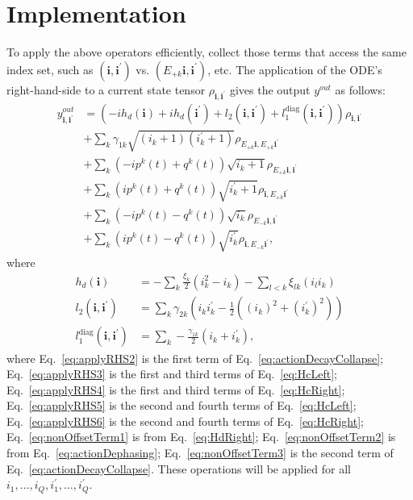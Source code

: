 \documentclass[letterpaper]{article}
\newcommand{\bfi}{\boldsymbol{i}}
\newcommand{\Epk}{E_{+k}}
\newcommand{\Emk}{E_{-k}}
\newcommand{\YC}[1]{{\textcolor{Bronze}{#1}}}
\begin{document}
\section{Implementation}

  To apply the above operators efficiently, collect those terms that access the
  same index set, such as $(\bfi,\bfi^\prime)$ vs. $(E_{+k}\bfi, \bfi^\prime)$,
  etc. The application of the ODE's right-hand-side to a current state tensor
  $\rho_{\bfi,\bfi^\prime}$ gives the output $y^{out}$ as follows:
  \begin{align} 
       y^{out}_{\bfi,\bfi^\prime}  &= 
       \left(-i h_d(\bfi) + ih_d(\bfi^\prime)
        + l_2(\bfi,\bfi^\prime) + l_1^{\text{diag}}(\bfi, \bfi^\prime) \right)
        \rho_{\bfi,\bfi^\prime} \label{eq:applyRHS1} \\
        &+ \sum_k \gamma_{1k} \sqrt{(i_k+1)(i_k^\prime+1)} \rho_{E_{+k}\bfi,
        E_{+k}\bfi^\prime} \label{eq:applyRHS2} \\
        &+ \sum_k \left(-ip^k(t) + q^k(t)\right) \sqrt{i_k+1} \rho_{\Epk \bfi,
        \bfi^\prime} \label{eq:applyRHS3} \\
        &+ \sum_k \left( ip^k(t) + q^k(t)\right) \sqrt{i_k^\prime+1}
        \rho_{\bfi,\Epk \bfi^\prime} \label{eq:applyRHS4} \\
        &+ \sum_k \left(-ip^k(t) - q^k(t)\right) \sqrt{i_k} \rho_{\Emk \bfi,
        \bfi^\prime} \label{eq:applyRHS5} \\
        &+ \sum_k \left( ip^k(t) - q^k(t)\right) \sqrt{i_k^\prime}
        \rho_{\bfi,\Emk \bfi^\prime},  \label{eq:applyRHS6}
  \end{align}
  where 
  \begin{align}
    h_d(\bfi) &= -\sum_k \frac{\xi_k}{2}(i_k^2 - i_k) - \sum_{l<k} \xi_{lk} (i_l
    i_k) \label{eq:nonOffsetTerm1} \\
    l_2(\bfi,\bfi^\prime) &= \sum_k \gamma_{2k} \left(i_ki_k^\prime - \frac 12
    \left( (i_k)^2 + (i_k^\prime)^2\right) \right) \label{eq:nonOffsetTerm2} \\
    l_1^{\text{diag}}(\bfi, \bfi^\prime) &= \sum_k
    -\frac{\gamma_{1k}}{2}\left(i_k + i_k^\prime\right),
    \label{eq:nonOffsetTerm3} 
  \end{align}
  \YC{where Eq.~\eqref{eq:applyRHS2} is the first term of
  Eq.~\eqref{eq:actionDecayCollapse}; Eq.~\eqref{eq:applyRHS3} is the first and
  third terms of Eq.~\eqref{eq:HcLeft}; Eq.~\eqref{eq:applyRHS4} is the first
  and third terms of Eq.~\eqref{eq:HcRight}; Eq.~\eqref{eq:applyRHS5} is the
  second and fourth terms of Eq.~\eqref{eq:HcLeft}; Eq.~\eqref{eq:applyRHS6} is
  the second and fourth terms of Eq.~\eqref{eq:HcRight};
  Eq.~\eqref{eq:nonOffsetTerm1} is from Eq.~\eqref{eq:HdRight};
  Eq.~\eqref{eq:nonOffsetTerm2} is from Eq.~\eqref{eq:actionDephasing};
  Eq.~\eqref{eq:nonOffsetTerm3} is the second term of
  Eq.~\eqref{eq:actionDecayCollapse}.}
  These operations will be applied for all $i_1,\dots, i_Q, i_1^\prime, \dots,
  i_Q^\prime$. 
  
\end{document}
